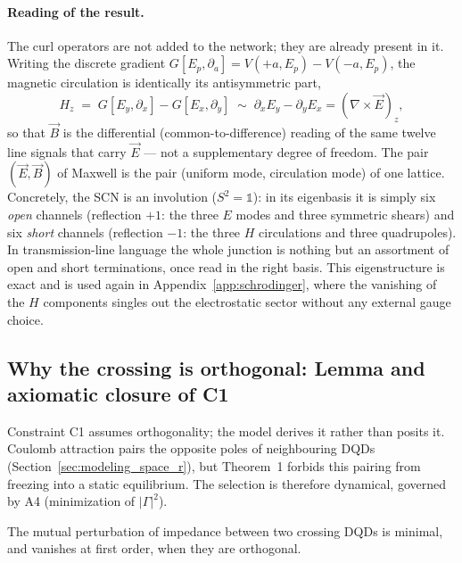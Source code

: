 \documentclass[11pt,a4paper]{article}
\theoremstyle{plain}
\theoremstyle{remark}
\begin{document}
\paragraph{Reading of the result.} The curl operators are not added to the network; they are already present in it. Writing the discrete gradient $G[E_p,\partial_a] = V(+a,E_p) - V(-a,E_p)$, the magnetic circulation is identically its antisymmetric part,
\begin{equation}\label{maxwell3d:curl}
H_z \;=\; G[E_y,\partial_x] - G[E_x,\partial_y] \;\sim\; \partial_x E_y - \partial_y E_x = (\nabla\times\vec E)_z,
\end{equation}
so that $\vec B$ is the differential (common-to-difference) reading of the same twelve line signals that carry $\vec E$ --- not a supplementary degree of freedom. The pair $(\vec E,\vec B)$ of Maxwell is the pair (uniform mode, circulation mode) of one lattice. Concretely, the SCN is an involution ($S^2=\mathbb1$): in its eigenbasis it is simply six \emph{open} channels (reflection $+1$: the three $E$ modes and three symmetric shears) and six \emph{short} channels (reflection $-1$: the three $H$ circulations and three quadrupoles). In transmission-line language the whole junction is nothing but an assortment of open and short terminations, once read in the right basis. This eigenstructure is exact and is used again in Appendix~\ref{app:schrodinger}, where the vanishing of the $H$ components singles out the electrostatic sector without any external gauge choice.

\subsection{Why the crossing is orthogonal: Lemma and axiomatic closure of C1}
\label{maxwell3d:orthogonality}

Constraint C1 assumes orthogonality; the model derives it rather than posits it. Coulomb attraction pairs the opposite poles of neighbouring DQDs (Section~\ref{sec:modeling_space_r}), but Theorem~1 forbids this pairing from freezing into a static equilibrium. The selection is therefore dynamical, governed by A4 (minimization of $|\Gamma|^2$).

\begin{description}[leftmargin=0pt]
\item[Lemma (Orthogonal decoupling).] The mutual perturbation of impedance between two crossing DQDs is minimal, and vanishes at first order, when they are orthogonal.
\end{description}
\end{document}
